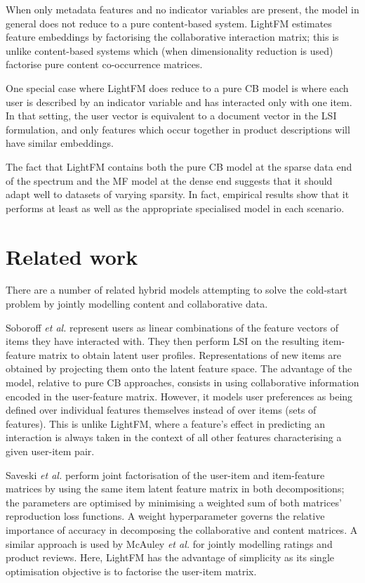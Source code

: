 \documentclass{sig-alternate}
\begin{document}
When only metadata features and no indicator variables are present, the model in general does not reduce to a pure content-based system. LightFM estimates feature embeddings by factorising the collaborative interaction matrix; this is unlike content-based systems which (when dimensionality reduction is used) factorise pure content co-occurrence matrices.

One special case where LightFM does reduce to a pure CB model is where each user is described by an indicator variable and has interacted only with one item. In that setting, the user vector is equivalent to a document vector in the LSI formulation, and only features which occur together in product descriptions will have similar embeddings.

The fact that LightFM contains both the pure CB model at the sparse data end of the spectrum and the MF model at the dense end suggests that it should adapt well to datasets of varying sparsity. In fact, empirical results show that it performs at least as well as the appropriate specialised model in each scenario.

\section{Related work}
\label{sec:related}
There are a number of related hybrid models attempting to solve the cold-start problem by jointly modelling content and collaborative data.

Soboroff \textit{et al.} \cite{soboroff1999combining} represent users as linear combinations of the feature vectors of items they have interacted with. They then perform LSI on the resulting item-feature matrix to obtain latent user profiles. Representations of new items are obtained by projecting them onto the latent feature space. The advantage of the model, relative to pure CB approaches, consists in using collaborative information encoded in the user-feature matrix. However, it models user preferences as being defined over individual features themselves instead of over items (sets of features). This is unlike LightFM, where a feature's effect in predicting an interaction is always taken in the context of all other features characterising a given user-item pair.

Saveski \textit{et al.} \cite{saveski2014item} perform joint factorisation of the user-item and item-feature matrices by using the same item latent feature matrix in both decompositions; the parameters are optimised by minimising a weighted sum of both matrices' reproduction loss functions. A weight hyperparameter governs the relative importance of accuracy in decomposing the collaborative and content matrices. A similar approach is used by McAuley \emph{et al.} \cite{mcauley2013hidden} for jointly modelling ratings and product reviews. Here, LightFM has the advantage of simplicity as its single optimisation objective is to factorise the user-item matrix.
\end{document}
